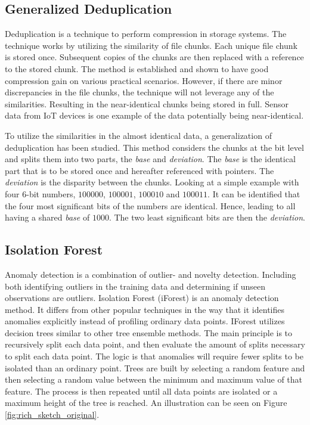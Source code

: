 \subsection{Generalized Deduplication}
Deduplication is a technique to perform compression in storage systems. The technique works by utilizing the similarity of file chunks. Each unique file chunk is stored once. Subsequent copies of the chunks are then replaced with a reference to the stored chunk. The method is established and shown to have good compression gain on various practical scenarios\cite{deduplication}. However, if there are minor discrepancies in the file chunks, the technique will not leverage any of the similarities. Resulting in the near-identical chunks being stored in full. Sensor data from IoT devices is one example of the data potentially being near-identical.

To utilize the similarities in the almost identical data, a generalization of deduplication has been studied.
This method considers the chunks at the bit level and splits them into two parts, the \textit{base} and \textit{deviation}. The \textit{base} is the identical part that is to be stored once and hereafter referenced with pointers. The \textit{deviation} is the disparity between the chunks. Looking at a simple example with four 6-bit numbers, $100000$, $100001$, $100010$ and $100011$. It can be identified that the four most significant bits of the numbers are identical. Hence, leading to all having a shared \textit{base} of $1000$. The two least significant bits are then the \textit{deviation}\cite{gen-deduplication}.

\subsection{Isolation Forest}
Anomaly detection is a combination of outlier- and novelty detection. Including both identifying outliers in the training data and determining if unseen observations are outliers. Isolation Forest (iForest) is an anomaly detection method. It differs from other popular techniques in the way that it identifies anomalies explicitly instead of profiling ordinary data points\cite{iforest}. IForest utilizes decision trees similar to other tree ensemble methods.
The main principle is to recursively split each data point, and then evaluate the amount of splits necessary to split each data point. The logic is that anomalies will require fewer splits to be isolated than an ordinary point.
Trees are built by selecting a random feature and then selecting a random value between the minimum and maximum value of that feature. The process is then repeated until all data points are isolated or a maximum height of the tree is reached. An illustration can be seen on Figure \ref{fig:rich_sketch_original}.

